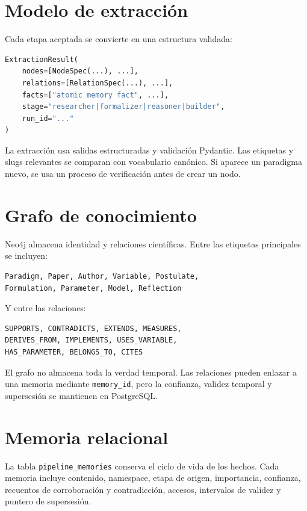 \section{Modelo de extracción}

Cada etapa aceptada se convierte en una estructura validada:

\begin{lstlisting}[language=Python]
ExtractionResult(
    nodes=[NodeSpec(...), ...],
    relations=[RelationSpec(...), ...],
    facts=["atomic memory fact", ...],
    stage="researcher|formalizer|reasoner|builder",
    run_id="..."
)
\end{lstlisting}

La extracción usa salidas estructuradas y validación Pydantic. Las etiquetas y
slugs relevantes se comparan con vocabulario canónico. Si aparece un paradigma
nuevo, se usa un proceso de verificación antes de crear un nodo.

\section{Grafo de conocimiento}

Neo4j almacena identidad y relaciones científicas. Entre las etiquetas
principales se incluyen:

\begin{verbatim}
Paradigm, Paper, Author, Variable, Postulate,
Formulation, Parameter, Model, Reflection
\end{verbatim}

Y entre las relaciones:

\begin{verbatim}
SUPPORTS, CONTRADICTS, EXTENDS, MEASURES,
DERIVES_FROM, IMPLEMENTS, USES_VARIABLE,
HAS_PARAMETER, BELONGS_TO, CITES
\end{verbatim}

El grafo no almacena toda la verdad temporal. Las relaciones pueden enlazar a
una memoria mediante \texttt{memory\_id}, pero la confianza, validez temporal y
supersesión se mantienen en PostgreSQL.

\section{Memoria relacional}

La tabla \texttt{pipeline\_memories} conserva el ciclo de vida de los hechos.
Cada memoria incluye contenido, namespace, etapa de origen, importancia,
confianza, recuentos de corroboración y contradicción, accesos, intervalos de
validez y puntero de supersesión.

